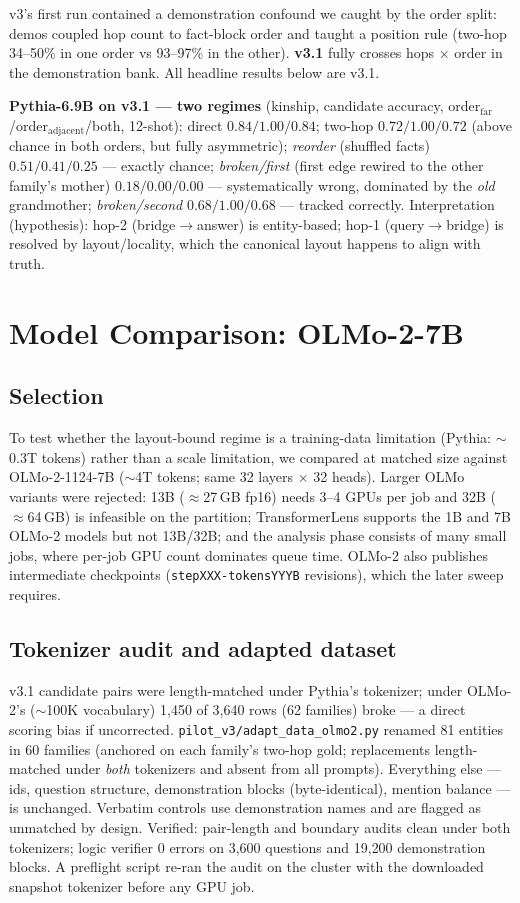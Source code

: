 \documentclass[11pt,a4paper]{article}
\newcommand{\file}[1]{\nolinkurl{#1}}
\begin{document}
v3's first run contained a demonstration confound we caught by the order split: demos coupled hop count to fact-block order and taught a position rule (two-hop 34--50\% in one order vs 93--97\% in the other). \textbf{v3.1} fully crosses hops $\times$ order in the demonstration bank. All headline results below are v3.1.

\textbf{Pythia-6.9B on v3.1 --- two regimes} (kinship, candidate accuracy, order$_{\mathrm{far}}$/order$_{\mathrm{adjacent}}$/both, 12-shot):
direct $0.84/1.00/0.84$; two-hop $0.72/1.00/0.72$ (above chance in both orders, but fully asymmetric); \emph{reorder} (shuffled facts) $0.51/0.41/0.25$ --- exactly chance; \emph{broken/first} (first edge rewired to the other family's mother) $0.18/0.00/0.00$ --- systematically wrong, dominated by the \emph{old} grandmother; \emph{broken/second} $0.68/1.00/0.68$ --- tracked correctly. Interpretation (hypothesis): hop-2 (bridge$\to$answer) is entity-based; hop-1 (query$\to$bridge) is resolved by layout/locality, which the canonical layout happens to align with truth.

\section{Model Comparison: OLMo-2-7B}
\subsection{Selection}
To test whether the layout-bound regime is a training-data limitation (Pythia: $\sim$0.3T tokens) rather than a scale limitation, we compared at matched size against OLMo-2-1124-7B ($\sim$4T tokens; same 32 layers $\times$ 32 heads). Larger OLMo variants were rejected: 13B ($\approx$27\,GB fp16) needs 3--4 GPUs per job and 32B ($\approx$64\,GB) is infeasible on the partition; TransformerLens supports the 1B and 7B OLMo-2 models but not 13B/32B; and the analysis phase consists of many small jobs, where per-job GPU count dominates queue time. OLMo-2 also publishes intermediate checkpoints (\texttt{stepXXX-tokensYYYB} revisions), which the later sweep requires.

\subsection{Tokenizer audit and adapted dataset}
v3.1 candidate pairs were length-matched under Pythia's tokenizer; under OLMo-2's ($\sim$100K vocabulary) 1{,}450 of 3{,}640 rows (62 families) broke --- a direct scoring bias if uncorrected. \file{pilot_v3/adapt_data_olmo2.py} renamed 81 entities in 60 families (anchored on each family's two-hop gold; replacements length-matched under \emph{both} tokenizers and absent from all prompts). Everything else --- ids, question structure, demonstration blocks (byte-identical), mention balance --- is unchanged. Verbatim controls use demonstration names and are flagged as unmatched by design. Verified: pair-length and boundary audits clean under both tokenizers; logic verifier 0 errors on 3{,}600 questions and 19{,}200 demonstration blocks. A preflight script re-ran the audit on the cluster with the downloaded snapshot tokenizer before any GPU job.
\end{document}
